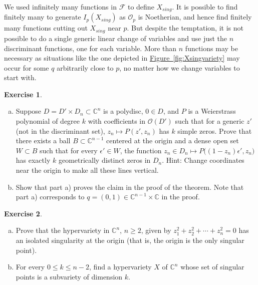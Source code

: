\documentclass[12pt,openany]{book}
\newcommand{\C}{{\mathbb{C}}}
\newcommand{\sF}{{\mathscr{F}}}
\newcommand{\sO}{{\mathscr{O}}}
\theoremstyle{plain}
\theoremstyle{remark}
\theoremstyle{definition}
\newenvironment{exbox}{%
    \def\FrameCommand{\vrule width 1pt \relax\hspace{10pt}}%
    \MakeFramed{\advance\hsize-\width\FrameRestore}%
}{%
    \endMakeFramed
}
\newenvironment{exparts}{%
    \leavevmode\begin{enumerate}[a),noitemsep,topsep=0pt,parsep=0pt,partopsep=0pt]
}{%
    \end{enumerate}
}
\theoremstyle{exercise}
\newtheorem{exercise}{Exercise}[section]
\theoremstyle{example}
\newcommand{\figureref}[1]{\hyperref[#1]{Figure~\ref*{#1}}}
\begin{document}
\pagebreak[2]
We used infinitely many functions in $\sF$ to define
$X_{\mathit{sing}}$.  It is possible to find finitely many
to generate $I_p(X_{\mathit{sing}})$
as $\sO_p$ is Noetherian, and hence find finitely
many functions cutting out $X_{\mathit{sing}}$ near $p$.
But despite the temptation, it is not possible to do a single
generic linear change of variables and use just the
$n$ discriminant functions, one for each variable.
More than $n$ functions
may be necessary as situations like the one depicted in
\figureref{fig:Xsingvariety} may occur for some
$q$ arbitrarily close to $p$,
no matter how we change
variables to start with.

\begin{exbox}
\begin{exercise} \label{exercise:nonverticalintersections}
\begin{exparts}
\item
Suppose $D = D' \times D_n \subset \C^n$ is a polydisc, $0 \in D$,
and $P$ is a Weierstrass polynomial of degree $k$ with
coefficients in $\sO(D')$
such that for a generic $z'$ (not in the discriminant set),
$z_n \mapsto P(z',z_n)$ has $k$ simple zeros.
Prove that there exists a ball $B \subset \C^{n-1}$ centered at the origin
and a dense open set $W \subset B$
such that
for every $\epsilon' \in W$, the function
$z_n \in D_n \mapsto P\bigl( (1-z_n) \epsilon' , z_n \bigr)$
has exactly $k$ geometrically distinct zeros in $D_n$.
Hint: Change coordinates near the origin to make all these lines vertical.
\item
Show that part a) proves the claim in the proof of the theorem.
Note that part a) corresponds to $q = (0,1) \in \C^{n-1} \times \C$
in the proof.
\end{exparts}
\end{exercise}

\begin{exercise} \label{exercise:morsesingularity}
\pagebreak[3]
\begin{exparts}
\item
Prove that the hypervariety in $\C^n$, $n \geq 2$, given by $z_1^2 + z_2^2 + \cdots + z_n^2 = 0$
has an isolated singularity at the origin (that is, the origin is the only
singular point).
\item
For every $0 \leq k \leq n-2$, find a hypervariety $X$ of $\C^n$ whose set
of singular points is a subvariety of dimension $k$.
\end{exparts}
\end{exercise}
\end{exbox}
\end{document}

